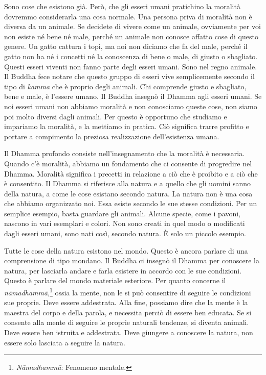 Sono cose che esistono già. Però, che gli esseri umani pratichino la
moralità dovremmo considerarla una cosa normale. Una persona priva di
moralità non è diversa da un animale. Se decidete di vivere come un
animale, ovviamente per voi non esiste né bene né male, perché un
animale non conosce affatto cose di questo genere. Un gatto cattura i
topi, ma noi non diciamo che fa del male, perché il gatto non ha né i
concetti né la conoscenza di bene o male, di giusto o sbagliato. Questi
esseri viventi non fanno parte degli esseri umani. Sono nel regno
animale. Il Buddha fece notare che questo gruppo di esseri vive
semplicemente secondo il tipo di \emph{kamma} che è proprio degli
animali. Chi comprende giusto e sbagliato, bene e male, è l'essere
umano. Il Buddha insegnò il Dhamma agli esseri umani. Se noi esseri
umani non abbiamo moralità e non conosciamo queste cose, non siamo poi
molto diversi dagli animali. Per questo è opportuno che studiamo e
impariamo la moralità, e la mettiamo in pratica. Ciò significa trarre
profitto e portare a compimento la preziosa realizzazione dell'esistenza
umana.

Il Dhamma profondo consiste nell'insegnamento che la moralità è
necessaria. Quando c'è moralità, abbiamo un fondamento che ci consente
di progredire nel Dhamma. Moralità significa i precetti in relazione a
ciò che è proibito e a ciò che è consentito. Il Dhamma si riferisce alla
natura e a quello che gli uomini sanno della natura, a come le cose
esistano secondo natura. La natura non è una cosa che abbiamo
organizzato noi. Essa esiste secondo le sue stesse condizioni. Per un
semplice esempio, basta guardare gli animali. Alcune specie, come i
pavoni, nascono in vari esemplari e colori. Non sono creati in quel modo
o modificati dagli esseri umani, sono nati così, secondo natura. È solo
un piccolo esempio.

Tutte le cose della natura esistono nel mondo. Questo è ancora parlare
di una comprensione di tipo mondano. Il Buddha ci insegnò il Dhamma per
conoscere la natura, per lasciarla andare e farla esistere in accordo
con le sue condizioni. Questo è parlare del mondo materiale esteriore.
Per quanto concerne il \emph{nāmadhammā},\footnote{\emph{Nāmadhammā}:
  Fenomeno mentale.} ossia la mente, non le si può consentire di seguire
le condizioni sue proprie. Deve essere addestrata. Alla fine, possiamo
dire che la mente è la maestra del corpo e della parola, e necessita
perciò di essere ben educata. Se si consente alla mente di seguire le
proprie naturali tendenze, si diventa animali. Deve essere ben istruita
e addestrata. Deve giungere a conoscere la natura, non essere solo
lasciata a seguire la natura.

